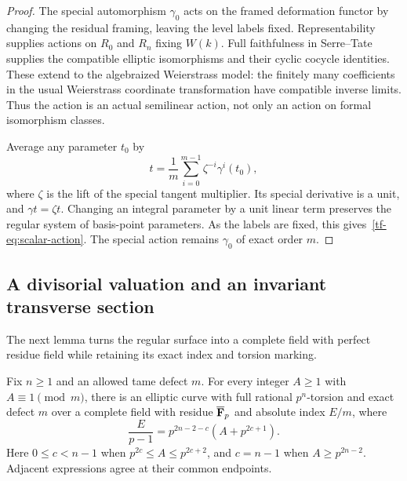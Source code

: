 \begin{proof}
The special automorphism $\gamma_0$ acts on the framed deformation functor by changing the residual framing, leaving the level labels fixed. Representability supplies actions on $R_0$ and $R_n$ fixing $W(k)$. Full faithfulness in Serre--Tate supplies the compatible elliptic isomorphisms and their cyclic cocycle identities. These extend to the algebraized Weierstrass model: the finitely many coefficients in the usual Weierstrass coordinate transformation have compatible inverse limits. Thus the action is an actual semilinear action, not only an action on formal isomorphism classes.

Average any parameter $t_0$ by
\[
 t=\frac1m\sum_{i=0}^{m-1}\zeta^{-i}\gamma^i(t_0),
\]
where $\zeta$ is the lift of the special tangent multiplier. Its special derivative is a unit, and $\gamma t=\zeta t$. Changing an integral parameter by a unit linear term preserves the regular system of basis-point parameters. As the labels are fixed, this gives~\eqref{tf-eq:scalar-action}. The special action remains $\gamma_0$ of exact order $m$.
\end{proof}

\subsection{A divisorial valuation and an invariant transverse section}
The next lemma turns the regular surface into a complete field with perfect residue field while retaining its exact index and torsion marking.

\begin{lemma}\label{tf-lem:realization}
Fix $n\ge1$ and an allowed tame defect $m$. For every integer $A\ge1$ with $A\equiv1\pmod m$, there is an elliptic curve with full rational $p^n$-torsion and exact defect $m$ over a complete field with residue $\overline{\mathbf F}_p$ and absolute index $E/m$, where
\begin{equation}\label{tf-eq:index-A}
 \frac{E}{p-1}=p^{2n-2-c}(A+p^{2c+1}).
\end{equation}
Here $0\le c<n-1$ when $p^{2c}\le A\le p^{2c+2}$, and $c=n-1$ when $A\ge p^{2n-2}$. Adjacent expressions agree at their common endpoints.
\end{lemma}

